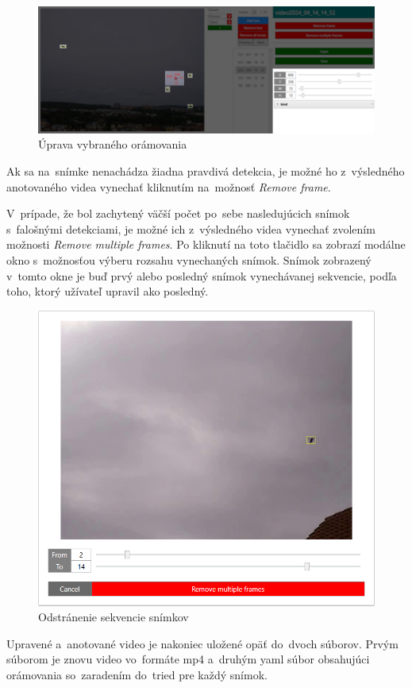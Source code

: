         \begin{figure}[H]
            \centering
            \includegraphics[width=\textwidth]{obrazky/video_annotator/bbox_edit.png}
            \caption{Úprava vybraného orámovania}
        \end{figure}

        Ak sa na~snímke nenachádza žiadna pravdivá detekcia, je možné ho z~výsledného anotovaného videa vynechať kliknutím na~možnosť \emph{Remove frame}.

        V~prípade, že bol zachytený väčší počet po~sebe nasledujúcich snímok s~falošnými detekciami, je možné ich z~výsledného videa vynechať zvolením možnosti \emph{Remove multiple frames}. Po kliknutí na toto tlačidlo sa zobrazí modálne okno s~možnosťou výberu rozsahu vynechaných snímok. Snímok zobrazený v~tomto okne je buď prvý alebo posledný snímok vynechávanej sekvencie, podľa toho, ktorý užívateľ upravil ako posledný.

        \begin{figure}[H]
            \centering
            \includegraphics[width=.65\textwidth]{obrazky/video_annotator/remove_multiple_frames.png}
            \caption{Odstránenie sekvencie snímkov}
        \end{figure}

        Upravené a~anotované video je nakoniec uložené opäť do~dvoch súborov. Prvým súborom je znovu video vo~formáte mp4 a~druhým yaml súbor obsahujúci orámovania so~zaradením do~tried pre každý snímok.


